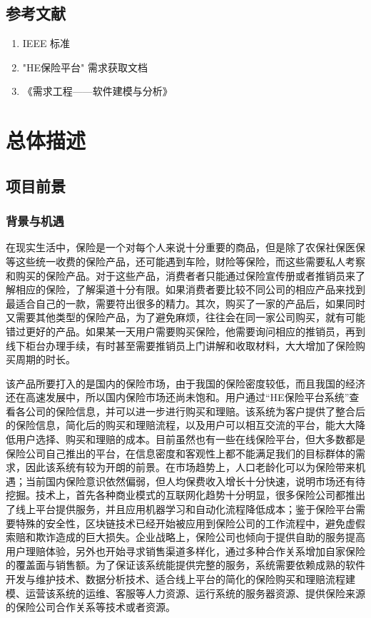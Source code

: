 \documentclass[a4paper]{ctexart}
\begin{document}
\subsection{参考文献}

\begin{enumerate}
  \item IEEE 标准
  \item "HE保险平台" 需求获取文档
  \item 《需求工程——软件建模与分析》
\end{enumerate}

\section{总体描述}

\subsection{项目前景}

\subsubsection{背景与机遇}

在现实生活中，保险是一个对每个人来说十分重要的商品，但是除了农保社保医保等这些统一收费的保险产品，还可能遇到车险，财险等保险，而这些需要私人考察和购买的保险产品。对于这些产品，消费者者只能通过保险宣传册或者推销员来了解相应的保险，了解渠道十分有限。如果消费者要比较不同公司的相应产品来找到最适合自己的一款，需要符出很多的精力。其次，购买了一家的产品后，如果同时又需要其他类型的保险产品，为了避免麻烦，往往会在同一家公司购买，就有可能错过更好的产品。如果某一天用户需要购买保险，他需要询问相应的推销员，再到线下柜台办理手续，有时甚至需要推销员上门讲解和收取材料，大大增加了保险购买周期的时长。

该产品所要打入的是国内的保险市场，由于我国的保险密度较低，而且我国的经济还在高速发展中，所以国内保险市场还尚未饱和。用户通过“HE保险平台系统”查看各公司的保险信息，并可以进一步进行购买和理赔。该系统为客户提供了整合后的保险信息，简化后的购买和理赔流程，以及用户可以相互交流的平台，能大大降低用户选择、购买和理赔的成本。目前虽然也有一些在线保险平台，但大多数都是保险公司自己推出的平台，在信息密度和客观性上都不能满足我们的目标群体的需求，因此该系统有较为开朗的前景。在市场趋势上，人口老龄化可以为保险带来机遇；当前国内保险意识依然偏弱，但人均保费收入增长十分快速，说明市场还有待挖掘。技术上，首先各种商业模式的互联网化趋势十分明显，很多保险公司都推出了线上平台提供服务，并且应用机器学习和自动化流程降低成本；鉴于保险平台需要特殊的安全性，区块链技术已经开始被应用到保险公司的工作流程中，避免虚假索赔和欺诈造成的巨大损失。企业战略上，保险公司也倾向于提供自助的服务提高用户理赔体验，另外也开始寻求销售渠道多样化，通过多种合作关系增加自家保险的覆盖面与销售额。为了保证该系统能提供完整的服务，系统需要依赖成熟的软件开发与维护技术、数据分析技术、适合线上平台的简化的保险购买和理赔流程建模、运营该系统的运维、客服等人力资源、运行系统的服务器资源、提供保险来源的保险公司合作关系等技术或者资源。
\end{document}
